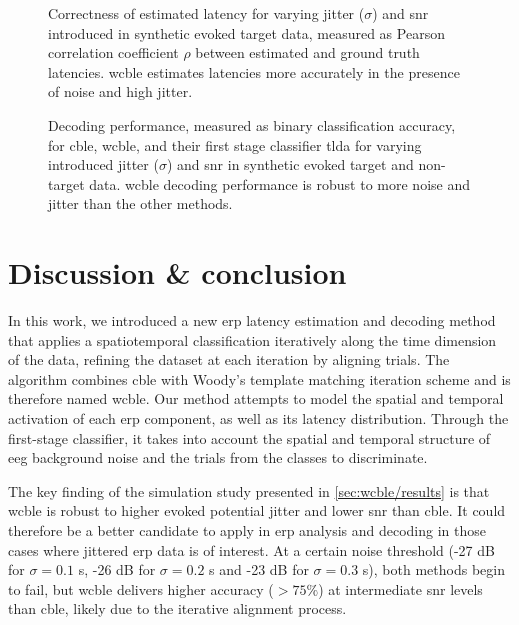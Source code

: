 \begin{figure}[t!]
  
  \caption[Synthetic latency estimation results]{Correctness of estimated
  latency for varying jitter ($\sigma$) and \ac{snr} introduced in synthetic evoked target
  data, measured as Pearson correlation coefficient $\rho$ between
  estimated and ground truth latencies.
  \Ac{wcble} estimates latencies more accurately in the presence of noise and
  high jitter.}
  \label{fig:wcble/results/latency}
\end{figure}


\begin{figure}[t!]
  \sffamily\sansmath
  
  \caption[Synthetic decoding results]{Decoding performance, measured as binary
  classification accuracy, for \ac{cble}, \ac{wcble}, and their first stage
  classifier \ac{tlda} for varying introduced jitter ($\sigma$) and \ac{snr} in
  synthetic evoked target and non-target data.
  \Ac{wcble} decoding performance is robust to more noise and jitter than the other methods.}
  \label{fig:wcble/results/accuracy}
\end{figure}

\section{Discussion \& conclusion}
\label{sec:wcble/conclusion}

In this work, we introduced a new \ac{erp} latency estimation and decoding
method that applies a spatiotemporal classification iteratively along the time
dimension of the data, refining the dataset at each iteration by aligning
trials.
The algorithm combines \acf{cble} with Woody's template matching iteration
scheme and is therefore named \acf{wcble}.
Our method attempts to model the spatial and temporal activation of
each \ac{erp} component, as well as its latency distribution.
Through the first-stage classifier, it takes into account the
spatial and temporal structure of \ac{eeg} background noise and the trials from the
classes to discriminate.

The key finding of the simulation study presented
in \cref{sec:wcble/results} is that \ac{wcble} is robust to higher evoked
potential jitter and lower \ac{snr} than \ac{cble}.
It could therefore be a better candidate to apply in \ac{erp} analysis and
decoding in those cases where jittered \ac{erp} data is of interest.
At a certain noise threshold (-27 dB for $\sigma=0.1$ s, -26 dB for
$\sigma=0.2$ s and -23 dB for $\sigma=0.3$ s), both methods begin to fail, but \ac{wcble}
delivers higher accuracy ($>75\%$) at intermediate \ac{snr} levels than
\ac{cble}, likely due to the iterative alignment process.

